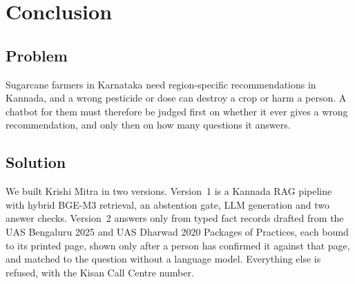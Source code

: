 \chapter{Conclusion}
\label{ch:conclusion}

\section{Problem}
Sugarcane farmers in Karnataka need region-specific recommendations in Kannada, and a
wrong pesticide or dose can destroy a crop or harm a person. A chatbot for them must
therefore be judged first on whether it ever gives a wrong recommendation, and only then
on how many questions it answers.

\section{Solution}
We built Krishi Mitra in two versions. Version~1 is a Kannada RAG pipeline with hybrid
BGE-M3 retrieval, an abstention gate, LLM generation and two answer checks. Version~2
answers only from typed fact records drafted from the UAS Bengaluru 2025 and UAS Dharwad
2020 Packages of Practices, each bound to its printed page, shown only after a person has
confirmed it against that page, and matched to the question without a language model.
Everything else is refused, with the Kisan Call Centre number.

